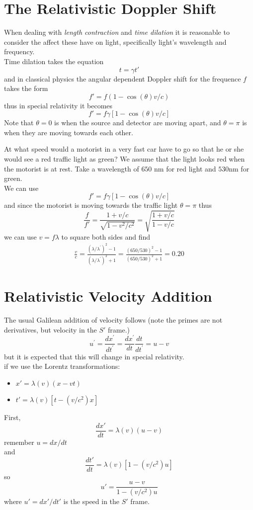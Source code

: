 \section{The Relativistic Doppler Shift}
When dealing with \textit{length contraction} and \textit{time dilation} it is reasonable to consider the affect these have on light, specifically light's wavelength and frequency. \\
Time dilation takes the equation \[ t = \gamma t' \] and in classical physics the angular dependent Doppler shift for the frequence $ f $ takes the form \[ f' = f(1-\cos(\theta) v/c) \] thus in special relativity it becomes \[ f' = f\gamma \left[1 - \cos(\theta) v/c\right] \] Note that $ \theta = 0 $ is when the source and detector are moving apart, and $ \theta = \pi $ is when they are moving towards each other. 
\begin{example}
	At what speed would a motorist in a very fast car have to go so that he or she would see a red traffic light as green? We assume that the light looks red when the motorist is at rest. Take a wavelength of $ 650 $ nm for red light and $ 530 $nm for green. \\
	
	We can use 
	\[ f' = f\gamma \left[1 - \cos(\theta) v/c\right] \]
	and since the motorist is moving towards the traffic light $ \theta = \pi $ thus 
	\[ \dfrac{f}{f'} = \dfrac{1 + v/c}{\sqrt{1 - v^2/c^2}} = \sqrt{\dfrac{1 + v/c}{1 - v/c}}\]
	we can use $ v = f\lambda $ to square both sides and find 
	\begin{align*}
	\frac { v } { c } = \frac { \left( \lambda / \lambda ^ { \prime } \right) ^ { 2 } - 1 } { \left( \lambda / \lambda ^ { \prime } \right) ^ { 2 } + 1 } = \frac { ( 650 / 530 ) ^ { 2 } - 1 } { ( 650 / 530 ) ^ { 2 } + 1 } = 0.20
	\end{align*}
\end{example}
\section{Relativistic Velocity Addition}
The usual Galilean addition of velocity follows (note the primes are not derivatives, but velocity in the $ S' $ frame.)
\[ u ^ { \prime } = \frac { d x ^ { \prime } } { d t ^ { \prime } } = \frac { d x ^ { \prime } } { d t } \frac { d t } { d t ^ { \prime } } = u - v \]
but it is expected that this will change in special relativity. \\
if we use the Lorentz transformations: 
\begin{itemize}
	\item $ x' = \lambda(v)(x-vt) $
	\item $ t' = \lambda(v)[t-(v/c^2)x] $
\end{itemize}
First, 
\[ \dfrac{dx'}{dt} = \lambda(v)(u-v)\]
remember $ u = dx/dt $\\
and
\[ \dfrac{dt'}{dt} = \lambda(v)[1-(v/c^2)u] \]
so 
\[ u' = \dfrac{u-v}{1-(v/c^2)u} \]
where $  u' = dx'/dt' $ is the speed in the $ S' $ frame. 










